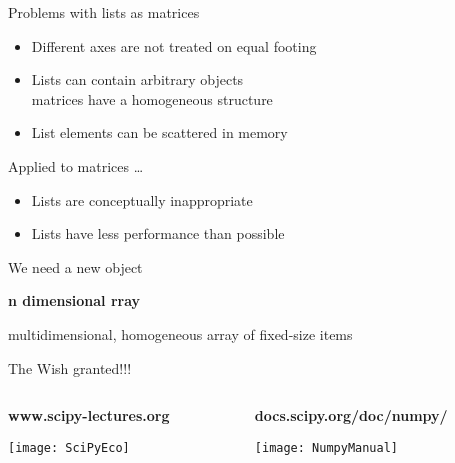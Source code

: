 \begin{frame}{Problems with lists as matrices}
 \begin{itemize}
  \item Different axes are not treated on equal footing
  \item Lists can contain arbitrary objects\\
        matrices have a homogeneous structure
  \item List elements can be scattered in memory
 \end{itemize}

 \vspace{0.3truecm}
 Applied to matrices \dots
 \begin{itemize}
  \item Lists are conceptually inappropriate
  \item Lists have less performance than possible
 \end{itemize}
\end{frame}

\begin{frame}{We need a new object}

 \begin{center}
  \textbf{\Huge\bfseries n dimensional rray}

  \vspace{0.5truecm}
  multidimensional, homogeneous array of fixed-size items
 \end{center}
\end{frame}

\begin{frame}[fragile, t]{The Wish granted!!!}
 \vspace*{-0.5truecm}
 \begin{columns}
  \begin{column}[t]{0.5\linewidth}
   \begin{center}
    \textbf{www.scipy-lectures.org}

    \texttt{[image: SciPyEco]}
   \end{center}
  \end{column}%
  \begin{column}[t]{0.5\linewidth}
   \begin{center}
    \textbf{docs.scipy.org/doc/numpy/}

    \vspace{0.3truecm}
    \texttt{[image: NumpyManual]}
   \end{center}
  \end{column}
 \end{columns}
\end{frame}


